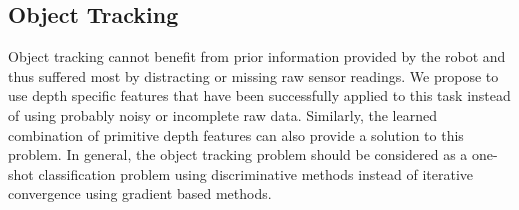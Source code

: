 \subsection{Object Tracking}

Object tracking cannot benefit from prior information provided by the robot and thus suffered most by distracting or missing raw sensor readings. We propose to use depth specific features that have been successfully applied to this task instead of using probably noisy or incomplete raw data. Similarly, the learned combination of primitive depth features can also provide a solution to this problem. In general, the object tracking problem should be considered as a one-shot classification problem using discriminative methods instead of iterative convergence using gradient based methods.
